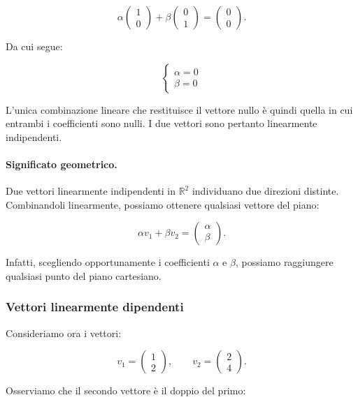 \[
\alpha
\begin{pmatrix}
1\\
0
\end{pmatrix}
+
\beta
\begin{pmatrix}
0\\
1
\end{pmatrix}
=
\begin{pmatrix}
0\\
0
\end{pmatrix}.
\]

Da cui segue:

\[
\begin{cases}
\alpha=0\\
\beta=0
\end{cases}
\]

L'unica combinazione lineare che restituisce il vettore nullo è quindi quella in cui entrambi i coefficienti sono nulli. I due vettori sono pertanto linearmente indipendenti.

\paragraph{Significato geometrico.}

Due vettori linearmente indipendenti in \(\mathbb{R}^2\) individuano due direzioni distinte. Combinandoli linearmente, possiamo ottenere qualsiasi vettore del piano:

\[
\alpha v_1+\beta v_2
=
\begin{pmatrix}
\alpha\\
\beta
\end{pmatrix}.
\]

Infatti, scegliendo opportunamente i coefficienti \(\alpha\) e \(\beta\), possiamo raggiungere qualsiasi punto del piano cartesiano.

\subsubsection{Vettori linearmente dipendenti}

Consideriamo ora i vettori:

\[
v_1 =
\begin{pmatrix}
1\\
2
\end{pmatrix},
\qquad
v_2 =
\begin{pmatrix}
2\\
4
\end{pmatrix}.
\]

Osserviamo che il secondo vettore è il doppio del primo:

